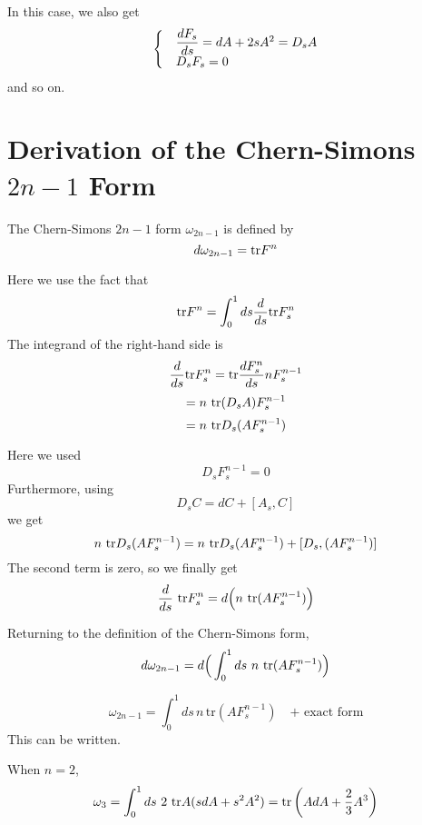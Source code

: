 \documentclass[uplatex]{jsarticle}
\begin{document}
In this case, we also get
$$
	\left\{
	\begin{matrix}
		 & \dfrac{dF_{s}}{ds} = dA + 2sA^{2} = D_{s} A \\
		 & \hspace{-70pt} D_{s} F_{s} = 0
	\end{matrix}
	\right.
$$
and so on.


\section{\textbf{Derivation of the Chern-Simons $2n-1$ Form}}

The Chern-Simons $2n-1$ form $\omega_{2n-1}$ is defined by
$$
	d \omega_{2n-1}
	=
	{\rm tr} F^{n}
$$

Here we use the fact that
$$
	{\rm tr} F^{n}
	=
	\int^{1}_{0} ds \dfrac{d}{ds} {\rm tr} F^{n}_{s}
$$
The integrand of the right-hand side is
$$
	\dfrac{d}{ds} {\rm tr} F^{n}_{s}
		=
		{\rm tr}
	\dfrac{d F^{n}_{s}}{ds} n F^{n-1}_{s}
$$
$$
	=
	n
	\ {\rm tr}
	(D_{s} A) F^{n-1}_{s}
$$
$$
	=
	n
	\ {\rm tr}
	D_{s} (A F^{n-1}_{s})
$$

Here we used
$$
	D_{s} F^{n-1}_{s}
	=
	0
$$
Furthermore, using
$$
	D_{s} C = dC + [A_{s},C]
$$
we get
$$
	n
	\ {\rm tr}
	D_{s} (A F^{n-1}_{s})
	=
	n
	\ {\rm tr}
	D_{s} (A F^{n-1}_{s})
	+
	[D_{s}, (A F^{n-1}_{s})]
$$
The second term is zero, so we finally get
$$
	\dfrac{d}{ds} \ {\rm tr} F^{n}_{s}
	=
	d
	\Big( n \ {\rm tr} (A F^{n-1}_{s}) \Big)
$$

Returning to the definition of the Chern-Simons form,
$$
	d \omega_{2n-1}
	=
	d
	\Big( \int^{1}_{0} ds \ n \ {\rm tr} (A F^{n-1}_{s}) \Big)
$$


$$
	\omega_{2n-1} = \int_0^1 ds \, n \, \text{tr} (A F_s^{n-1}) \quad \text{+ exact form}
$$
This can be written.

When $n=2$,
$$
	\omega_{3}
	=
	\int^{1}_{0} ds \ 2 \ {\rm tr} A (sdA + s^{2} A^{2})
	=
	{\rm tr} \left( AdA + \dfrac{2}{3} A^{3} \right)
$$
\end{document}
